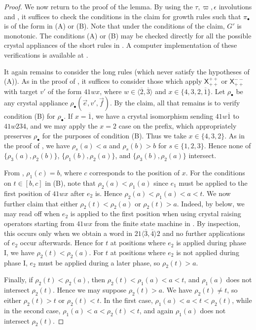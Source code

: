\documentclass{amsart}
\theoremstyle{definition}
\theoremstyle{remark}
\numberwithin{equation}{section}
\begin{document}
\begin{proof}
  We now return to the proof of the lemma. By using the $\tau, \varpi, \epsilon$ involutions and , it suffices to check the conditions in the claim for growth rules such that $\pi_\bullet$ is of the form in (A) or (B). Note that under the conditions of the claim, $G'$ is monotonic. The conditions (A) or (B) may be checked directly for all the possible crystal appliances of the short rules in . A computer implementation of these verifications is available at \cite[\S7]{sl4-web-basis-code}.

  It again remains to consider the long rules (which never satisfy the hypotheses of (A)).  As in the proof of , it suffices to consider those which apply $\mathsf{X}^{++}_{++}$ or $\mathsf{X}^{--}_{++}$ with target $v'$ of the form $41wx$, where $w \in \langle \overline{2}, \overline{3} \rangle$ and $x \in \{4, 3, 2, \overline{1}\}$. Let $\rho_\bullet$ be any crystal appliance $\rho_\bullet(\vec{e}, v',\vec{f})$. By the claim, all that remains is to verify condition (B) for $\rho_\bullet$. If $x = \overline{1}$, we have a crystal isomorphism sending $41w\overline{1}$ to $41w234$, and we may apply the $x=2$ case on the prefix, which appropriately preserves $\rho_\bullet$ for the purposes of condition (B). Thus we take $x \in \{4, 3, 2\}$. As in the proof of , we have $\rho_s(a) < a$ and $\rho_s(b) > b$ for $s \in \{1, 2, 3\}$. Hence none of $\{\rho_3(a), \rho_2(b)\}$, $\{\rho_1(b), \rho_2(a)\}$, and $\{\rho_3(b), \rho_2(a)\}$ intersect.
  
  From , $\rho_1(c) = b$, where $c$ corresponds to the position of $x$. For the conditions on $t \in [b, c]$ in (B), note that $\rho_2(a) < \rho_1(a)$ since $e_1$  must be applied to the first position of $41wx$ after $e_2$ is. Hence $\rho_2(a) < \rho_1(a) < a < t$. We now further claim that either $\rho_2(t) < \rho_2(a)$ or $\rho_2(t) > a$. Indeed, by  below, we may read off when $e_2$ is applied to the first position when using crystal raising operators starting from $41wx$ from the finite state machine in . By inspection, this occurs only when we obtain a word in $21\langle \overline{3},\overline{4} \rangle 2$ and no further applications of $e_2$ occur afterwards. Hence for $t$ at positions where $e_2$ is applied during phase I, we have $\rho_2(t) < \rho_2(a)$. For $t$ at positions where $e_2$ is not applied during phase I, $e_2$ must be applied during a later phase, so $\rho_2(t) > a$.

  Finally, if $\rho_2(t) < \rho_2(a)$, then $\rho_2(t) < \rho_1(a) < a < t$, and $\rho_1(a)$ does not intersect $\rho_2(t)$. Hence we may suppose $\rho_2(t) > a$. We have $\rho_2(t) \neq t$, so either $\rho_2(t) > t$ or $\rho_2(t) < t$. In the first case, $\rho_1(a) < a < t < \rho_2(t)$, while in the second case, $\rho_1(a) < a < \rho_2(t) < t$, and again $\rho_1(a)$ does not intersect $\rho_2(t)$.
\end{proof}
\end{document}
